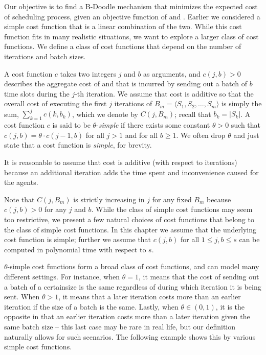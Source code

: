 Our objective is to find a B-Doodle mechanism that minimizes the expected cost of scheduling process, given an objective function of \Times and \Inconvenience.  Earlier we considered a simple cost function that is a linear combination of the two.  While this cost function fits in many realistic situations, we want to explore a larger class of cost functions. We define a class of cost functions that depend on the number of iterations and batch sizes.
\begin{definition} \label{bdoodle:def:cost-function}
A cost function $c$ takes two integers $j$ and $b$ as arguments, and $c(j, b) > 0$ describes the aggregate cost of \Times and \Inconveniences that is incurred by sending out a batch of $b$ time slots during the $j$-th iteration. We assume that cost is additive so that the overall cost of executing the first $j$ iterations of ${B}_m = \langle S_1, S_2, \dots, S_m \rangle$ is simply the sum, $\sum_{k=1}^{j} c(k, b_k)$, which we denote by $C(j, {B}_m)$; recall that $b_k = |S_k|$. 
A cost function $c$ is said to be $\theta$-\emph{simple} if there exists some constant $\theta>0$ such that $c(j, b) = \theta \cdot c(j-1, b)$ for all $j > 1$ and for all $b \geq 1$. We often drop $\theta$ and just state that a cost function is \emph{simple}, for brevity.
\end{definition}
It is reasonable to assume that cost is additive (with respect to iterations) because an additional iteration adds the time spent and inconvenience caused for the agents.

Note that $C(j, B_{m})$ is strictly increasing in $j$ for any fixed $B_{m}$ because $c(j, b) > 0$ for any $j$ and $b$. While the class of simple cost functions may seem too restrictive, we present a few natural choices of cost functions that belong to the class of simple cost functions. In this chapter we assume that the underlying cost function is simple; further we assume that $c(j, b)$ for all $1 \leq j, b \leq s$ can be computed in polynomial time with respect to $s$.

$\theta$-simple cost functions form a broad class of cost functions, and can model many different settings. 
For instance, when $\theta = 1$, it means that the cost of sending out a batch of a certainsize is the same regardless of during which iteration it is being sent. When $\theta > 1$, it means that a later iteration costs more than an earlier iteration if the size of a batch is the same. Lastly, when $\theta \in (0, 1)$, it is the opposite in that an earlier iteration costs more than a later iteration given the same batch size -- this last case may be rare in real life, but our definition naturally allows for such scenarios.
The following example shows this by various simple cost functions. 


